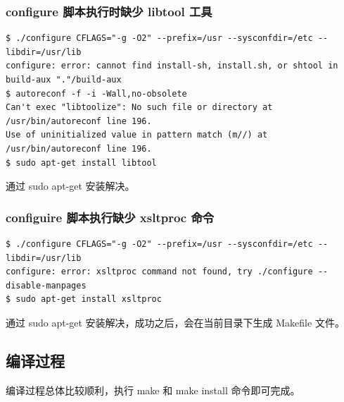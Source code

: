 \subsubsection{configure 脚本执行时缺少 libtool 工具}

{\begin{shaded}\begin{verbatim}
$ ./configure CFLAGS="-g -O2" --prefix=/usr --sysconfdir=/etc --libdir=/usr/lib
configure: error: cannot find install-sh, install.sh, or shtool in build-aux "."/build-aux
$ autoreconf -f -i -Wall,no-obsolete
Can't exec "libtoolize": No such file or directory at /usr/bin/autoreconf line 196.
Use of uninitialized value in pattern match (m//) at /usr/bin/autoreconf line 196.
$ sudo apt-get install libtool
\end{verbatim}\end{shaded}}
通过 sudo apt-get 安装解决。

\subsubsection{configuire 脚本执行缺少 xsltproc 命令}

{\begin{shaded}\begin{verbatim}
$ ./configure CFLAGS="-g -O2" --prefix=/usr --sysconfdir=/etc --libdir=/usr/lib
configure: error: xsltproc command not found, try ./configure --disable-manpages
$ sudo apt-get install xsltproc 
\end{verbatim}\end{shaded}}
通过 sudo apt-get 安装解决，成功之后，会在当前目录下生成 Makefile 文件。

\subsection{编译过程}

编译过程总体比较顺利，执行 make 和 make install 命令即可完成。

